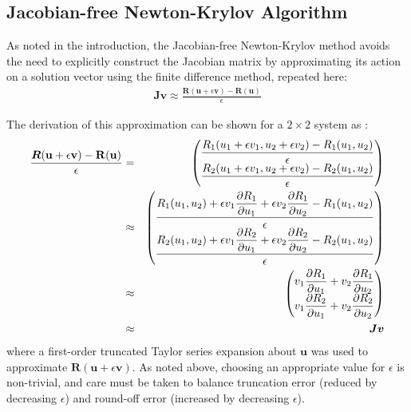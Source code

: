 \documentclass[sn-mathphys,Numbered]{sn-jnl}%
\newcommand{\bb}{\boldsymbol}
\begin{document}
\subsection{Jacobian-free Newton-Krylov Algorithm}
\label{sec:JFNK_alg}


As noted in the introduction, the Jacobian-free Newton-Krylov method avoids the need to explicitly construct the Jacobian matrix by approximating its action on a solution vector using the finite difference method, repeated here:
\begin{eqnarray} \label{eq:JF}
	\bb{J} \bb{v} \approx \frac{\bb{R}(\bb{u} + \epsilon \bb{v}) - \bb{R}(\bb{u})}{\epsilon}
\end{eqnarray}

The derivation of this approximation can be shown for a $2 \times 2$ system as \cite{Knoll2004}:
\begin{eqnarray}
	\frac{\bb{R}(\mathbf{u} + \epsilon \mathbf{v}) - \mathbf{R}(\mathbf{u})}{\epsilon}
	&=&
	\begin{pmatrix}
	\dfrac{R_1 (u_1 + \epsilon v_1, u_2 + \epsilon v_2) - R_1 (u_1, u_2)}{\epsilon}\\
	\dfrac{R_2 (u_1 + \epsilon v_1, u_2 + \epsilon v_2) - R_2 (u_1, u_2)}{\epsilon}
	\end{pmatrix} \notag \\
	&\approx&
	\begin{pmatrix}
	\dfrac{R_1 (u_1,u_2) + \epsilon v_1 \dfrac{\partial R_1}{\partial u_1} + \epsilon v_2 \dfrac{\partial R_1}{\partial u_2} - R_1 (u_1, u_2)}{\epsilon}\\
	\dfrac{R_2 (u_1, u_2) + \epsilon v_1 \dfrac{\partial R_2}{\partial u_1} + \epsilon v_2 \dfrac{\partial R_2}{\partial u_2}  - R_2 (u_1, u_2)}{\epsilon}
	\end{pmatrix} \notag \\
	&\approx&
	\begin{pmatrix}
	v_1 \dfrac{\partial R_1}{\partial u_1} +  v_2 \dfrac{\partial R_1}{\partial u_2} \\
	v_1 \dfrac{\partial R_2}{\partial u_1} + v_2 \dfrac{\partial R_2}{\partial u_2}
	\end{pmatrix} \notag \\
	&\approx&
	\bb{J} \bb{v}
\end{eqnarray}
where a first-order truncated Taylor series expansion about $\bb{u}$ was used to approximate $\bb{R} (\bb{u} + \epsilon \bb{v})$.
As noted above, choosing an appropriate value for $\epsilon$ is non-trivial, and care must be taken to balance truncation error (reduced by decreasing $\epsilon$) and round-off error (increased by decreasing $\epsilon$).
\end{document}
